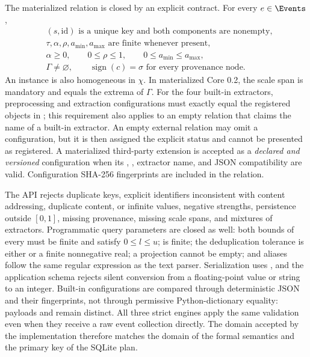 The materialized relation is closed by an explicit contract. For every $e\in\Events$,
\begin{equation}
\begin{aligned}
 &(s,\mathrm{id})\text{ is a unique key and both components are nonempty},\\
 &\tau,\alpha,\rho,a_{\min},a_{\max}\text{ are finite whenever present},\\
 &\alpha\geq0,\qquad 0\leq\rho\leq1,\qquad 0\leq a_{\min}\leq a_{\max},\\
 &\Gamma\neq\varnothing,\qquad \operatorname{sign}(c)=\sigma\text{ for every provenance node}.
\end{aligned}
\end{equation}
An  instance is also homogeneous in $\chi$. In materialized Core 0.2, the scale span is mandatory and equals the extrema of $\Gamma$. For the four built-in extractors, preprocessing and extraction configurations must exactly equal the registered objects in ; this requirement also applies to an empty relation that claims the name of a built-in extractor. An empty external relation may omit a configuration, but it is then assigned the explicit status  and cannot be presented as registered. A materialized third-party extension is accepted as a \emph{declared and versioned} configuration when its , , extractor name, and JSON compatibility are valid. Configuration SHA-256 fingerprints are included in the relation.

The API rejects duplicate keys, explicit identifiers inconsistent with content addressing, duplicate content,  or infinite values, negative strengths, persistence outside $[0,1]$, missing provenance, missing scale spans, and mixtures of extractors. Programmatic query parameters are closed as well: both bounds of every  must be finite and satisfy $0\leq l\leq u$;  is finite; the deduplication tolerance is either  or a finite nonnegative real; a projection cannot be empty; and aliases follow the same regular expression as the text parser. Serialization uses , and the application schema rejects silent conversion from a floating-point value or string to an integer. Built-in configurations are compared through deterministic JSON and their fingerprints, not through permissive Python-dictionary equality: payloads  and  remain distinct. All three strict engines apply the same validation even when they receive a raw event collection directly. The domain accepted by the implementation therefore matches the domain of the formal semantics and the primary key of the SQLite plan.


